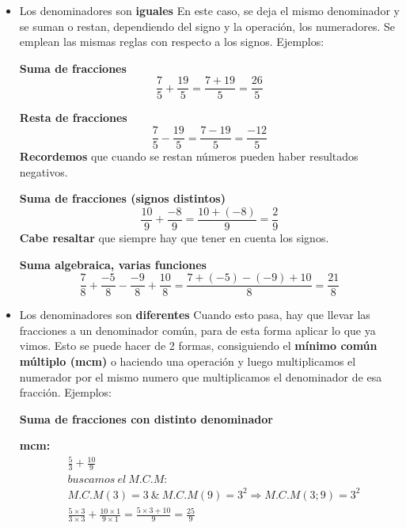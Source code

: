     \begin{itemize}
        \item Los denominadores son \textbf{iguales}
            En este caso, se deja el mismo denominador y se suman o restan,
            dependiendo del signo y la operación, los
            numeradores. Se emplean las mismas reglas con respecto a los signos. Ejemplos:

            \textbf{Suma de fracciones}
            $$\frac{7}{5} + \frac{19}{5} = \frac{7+19}{5} = \frac{26}{5}$$

            \textbf{Resta de fracciones}
            $$\frac{7}{5} - \frac{19}{5} = \frac{7-19}{5} = \frac{-12}{5}$$
            \textbf{Recordemos} que cuando se restan números pueden haber
            resultados negativos.

            \textbf{Suma de fracciones (signos distintos)}
            $$ \frac{10}{9} + \frac{-8}{9} = \frac{10 + (-8)}{9}  = \frac{2}{9}$$
            \textbf{Cabe resaltar} que siempre hay que tener en cuenta los signos.

            \textbf{Suma algebraica, varias funciones}
            $$\frac{7}{8} + \frac{-5}{8} - \frac{-9}{8} + \frac{10}{8} =
            \frac{7+(-5)-(-9)+10}{8} = \frac{21}{8} $$

        \item Los denominadores son \textbf{diferentes}
            Cuando esto pasa, hay que llevar las fracciones a un denominador común,
            para de esta forma aplicar lo que ya vimos. Esto se puede hacer de
            2 formas, consiguiendo el \textbf{mínimo común múltiplo (mcm)} o
            haciendo una operación  y luego multiplicamos el
            numerador por el mismo numero que multiplicamos el denominador de
            esa fracción. Ejemplos:

            \textbf{Suma de fracciones con distinto denominador}

            \textbf{mcm:}
            \begin{align*}
                &\frac{5}{3} + \frac{10}{9}\\
                &buscamos\ el\ M.C.M:\\
                &M.C.M(3) = 3\  \&\  M.C.M(9) = 3^2 \Rightarrow M.C.M(3;9) = 3^2\\
                &\frac{5\times3}{3\times3} + \frac{10\times1}{9\times1} = \frac{5\times3+10}{9} = \frac{25}{9}
            \end{align*}


\end{itemize}
